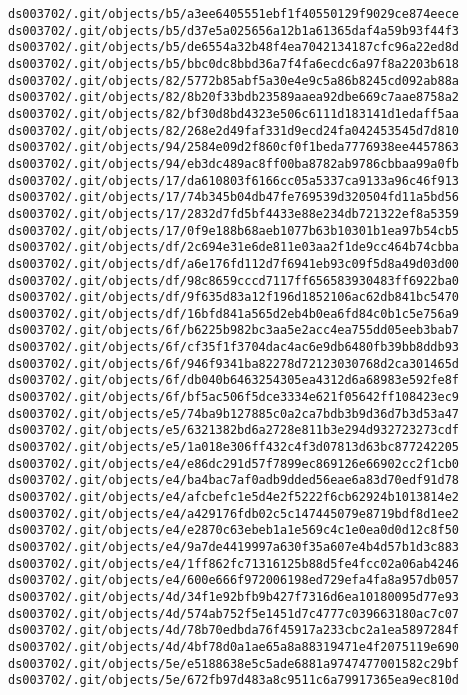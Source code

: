 \documentclass[11pt]{article}
\begin{document}
\begin{Verbatim}[commandchars=\\\{\}]
ds003702/.git/objects/b5/a3ee6405551ebf1f40550129f9029ce874eece
ds003702/.git/objects/b5/d37e5a025656a12b1a61365daf4a59b93f44f3
ds003702/.git/objects/b5/de6554a32b48f4ea7042134187cfc96a22ed8d
ds003702/.git/objects/b5/bbc0dc8bbd36a7f4fa6ecdc6a97f8a2203b618
ds003702/.git/objects/82/5772b85abf5a30e4e9c5a86b8245cd092ab88a
ds003702/.git/objects/82/8b20f33bdb23589aaea92dbe669c7aae8758a2
ds003702/.git/objects/82/bf30d8bd4323e506c6111d183141d1edaff5aa
ds003702/.git/objects/82/268e2d49faf331d9ecd24fa042453545d7d810
ds003702/.git/objects/94/2584e09d2f860cf0f1beda7776938ee4457863
ds003702/.git/objects/94/eb3dc489ac8ff00ba8782ab9786cbbaa99a0fb
ds003702/.git/objects/17/da610803f6166cc05a5337ca9133a96c46f913
ds003702/.git/objects/17/74b345b04db47fe769539d320504fd11a5bd56
ds003702/.git/objects/17/2832d7fd5bf4433e88e234db721322ef8a5359
ds003702/.git/objects/17/0f9e188b68aeb1077b63b10301b1ea97b54cb5
ds003702/.git/objects/df/2c694e31e6de811e03aa2f1de9cc464b74cbba
ds003702/.git/objects/df/a6e176fd112d7f6941eb93c09f5d8a49d03d00
ds003702/.git/objects/df/98c8659cccd7117ff656583930483ff6922ba0
ds003702/.git/objects/df/9f635d83a12f196d1852106ac62db841bc5470
ds003702/.git/objects/df/16bfd841a565d2eb4b0ea6fd84c0b1c5e756a9
ds003702/.git/objects/6f/b6225b982bc3aa5e2acc4ea755dd05eeb3bab7
ds003702/.git/objects/6f/cf35f1f3704dac4ac6e9db6480fb39bb8ddb93
ds003702/.git/objects/6f/946f9341ba82278d72123030768d2ca301465d
ds003702/.git/objects/6f/db040b6463254305ea4312d6a68983e592fe8f
ds003702/.git/objects/6f/bf5ac506f5dce3334e621f05642ff108423ec9
ds003702/.git/objects/e5/74ba9b127885c0a2ca7bdb3b9d36d7b3d53a47
ds003702/.git/objects/e5/6321382bd6a2728e811b3e294d932723273cdf
ds003702/.git/objects/e5/1a018e306ff432c4f3d07813d63bc877242205
ds003702/.git/objects/e4/e86dc291d57f7899ec869126e66902cc2f1cb0
ds003702/.git/objects/e4/ba4bac7af0adb9dded56eae6a83d70edf91d78
ds003702/.git/objects/e4/afcbefc1e5d4e2f5222f6cb62924b1013814e2
ds003702/.git/objects/e4/a429176fdb02c5c147445079e8719bdf8d1ee2
ds003702/.git/objects/e4/e2870c63ebeb1a1e569c4c1e0ea0d0d12c8f50
ds003702/.git/objects/e4/9a7de4419997a630f35a607e4b4d57b1d3c883
ds003702/.git/objects/e4/1ff862fc71316125b88d5fe4fcc02a06ab4246
ds003702/.git/objects/e4/600e666f972006198ed729efa4fa8a957db057
ds003702/.git/objects/4d/34f1e92bfb9b427f7316d6ea10180095d77e93
ds003702/.git/objects/4d/574ab752f5e1451d7c4777c039663180ac7c07
ds003702/.git/objects/4d/78b70edbda76f45917a233cbc2a1ea5897284f
ds003702/.git/objects/4d/4bf78d0a1ae65a8a88319471e4f2075119e690
ds003702/.git/objects/5e/e5188638e5c5ade6881a9747477001582c29bf
ds003702/.git/objects/5e/672fb97d483a8c9511c6a79917365ea9ec810d

\end{Verbatim}
\end{document}
